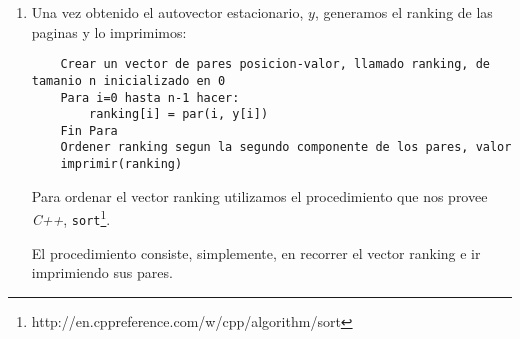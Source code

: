 \begin{enumerate}
	Los procedimientos auxiliares multiplicarMatrices, multiplicarMatrizPorVector y phi son procedimientos estandar, por lo cual no los detallamos.

	Normalizar un vector, en nuestra implementacion, implica dividir cada componente del vector por la norma 1 del mismo.
	\item Una vez obtenido el autovector estacionario, $y$, generamos el ranking de las paginas y lo imprimimos:
	\begin{lstlisting}
	Crear un vector de pares posicion-valor, llamado ranking, de tamanio n inicializado en 0
	Para i=0 hasta n-1 hacer:
		ranking[i] = par(i, y[i])
	Fin Para
	Ordener ranking segun la segundo componente de los pares, valor
	imprimir(ranking)
	\end{lstlisting}
	Para ordenar el vector ranking utilizamos el procedimiento que nos provee \textit{C++},  \texttt{sort}\footnote{http://en.cppreference.com/w/cpp/algorithm/sort}.

	El procedimiento consiste, simplemente, en recorrer el vector ranking e ir imprimiendo sus pares.
\end{enumerate}

